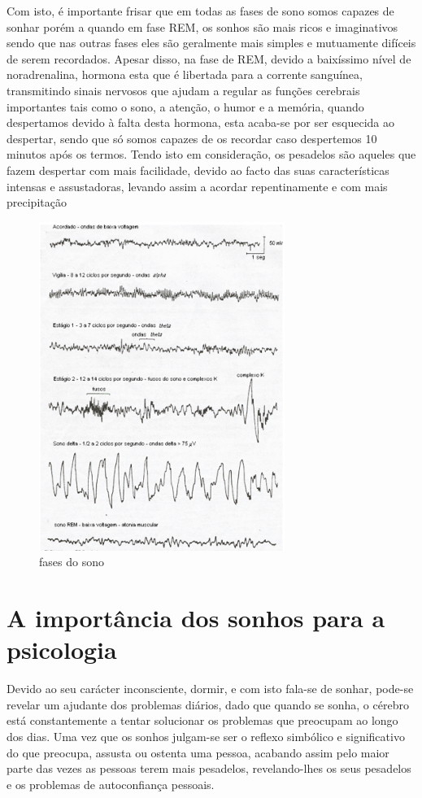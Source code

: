 \documentclass{report}
\begin{document}
Com isto, é importante frisar que em todas as fases de sono somos capazes de sonhar porém a quando em fase REM, os sonhos são mais ricos e imaginativos sendo que nas outras fases eles são geralmente mais simples e mutuamente difíceis de serem recordados. Apesar disso, na fase de REM, devido a baixíssimo nível de noradrenalina, hormona esta que é libertada para a corrente sanguínea, transmitindo sinais nervosos que ajudam a regular as funções cerebrais importantes tais como o sono, a atenção, o humor e a memória, quando despertamos devido à falta desta hormona, esta acaba-se por ser esquecida ao despertar, sendo que só somos capazes de os recordar caso despertemos 10 minutos após os termos. Tendo isto em consideração, os pesadelos são aqueles que fazem despertar com mais facilidade, devido ao facto das suas características intensas e assustadoras, levando assim a acordar repentinamente e com mais precipitação
\begin{figure}[h]
\center %
\includegraphics[width=80mm]{yyy.png}
\caption{fases do sono}
\label{fig:sono}
\end{figure}

\section{A importância dos sonhos para a psicologia}

Devido ao seu carácter inconsciente, dormir, e com isto fala-se de sonhar, pode-se revelar um ajudante dos problemas diários, dado que quando se sonha, o cérebro está constantemente a tentar solucionar os problemas que preocupam ao longo dos dias. Uma vez que os sonhos julgam-se ser o reflexo simbólico e significativo do que preocupa, assusta ou ostenta uma pessoa, acabando assim pelo maior parte das vezes as pessoas terem mais pesadelos, revelando-lhes os seus pesadelos e os problemas de autoconfiança pessoais.
\end{document}
